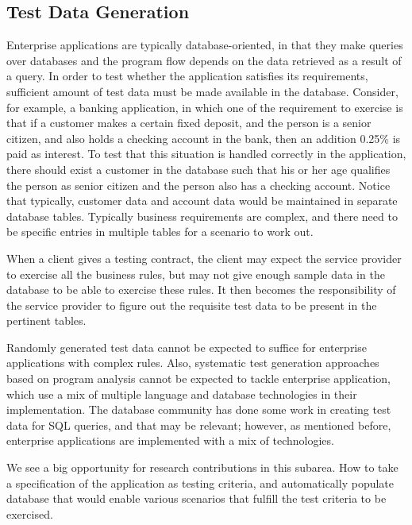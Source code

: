 \subsection{Test Data Generation}

Enterprise applications are typically database-oriented, in that they make queries over databases and the program flow depends on the data retrieved as a result of a query.  In order to test whether the application satisfies its requirements, sufficient amount of test data must be made available in the database. Consider, for example, a banking application, in which one of the requirement to exercise is that if a customer makes a certain fixed deposit, and the person is a senior citizen, and also holds a checking account in the bank, then an addition 0.25\% is paid as interest. To test that this situation is handled correctly in the application, there should exist a customer in the database such that his or her age qualifies the person as senior citizen and the person also has a checking account. Notice that typically, customer data and account data would be maintained in separate database tables. Typically business requirements are complex, and there need to be specific entries in multiple tables for a scenario to work out.

When a client gives a testing contract, the client may expect the service provider to exercise all the business rules, but may not give enough sample data in the database to be able to exercise these rules.  It then becomes the responsibility of the service provider to figure out the requisite test data to be present in the pertinent tables.

Randomly generated test data  cannot be expected to suffice for enterprise applications with complex rules. Also, systematic test generation approaches based on program analysis cannot be expected to tackle enterprise application, which use a mix of multiple language and database technologies in their implementation. The database community has done some work in creating test data for SQL queries, and that may be relevant; however, as mentioned before, enterprise applications are implemented with a mix of technologies.

We see a big opportunity for research contributions in this subarea. How to take a specification of the application as testing criteria, and automatically populate database that would enable various scenarios that fulfill the test criteria to be exercised.

